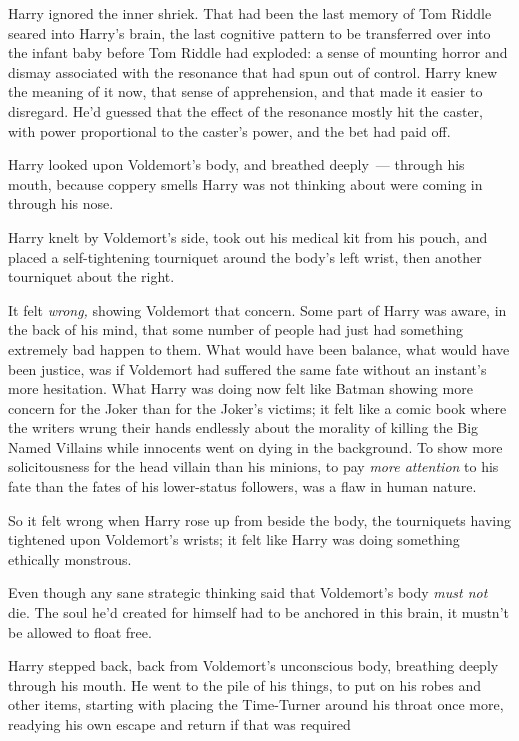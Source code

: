 Harry ignored the inner shriek. That had been the last memory of Tom Riddle
seared into Harry's brain, the last cognitive pattern to be transferred over
into the infant baby before Tom Riddle had exploded: a sense of mounting horror
and dismay associated with the resonance that had spun out of control. Harry
knew the meaning of it now, that sense of apprehension, and that made it easier
to disregard. He'd guessed that the effect of the resonance mostly hit the
caster, with power proportional to the caster's power, and the bet had paid off.

Harry looked upon Voldemort's body, and breathed deeply~--- through his mouth,
because coppery smells Harry was not thinking about were coming in through his
nose.

Harry knelt by Voldemort's side, took out his medical kit from his pouch, and
placed a self-tightening tourniquet around the body's left wrist, then another
tourniquet about the right.

It felt \emph{wrong,} showing Voldemort that concern. Some part of Harry was
aware, in the back of his mind, that some number of people had just had
something extremely bad happen to them. What would have been balance, what
would have been justice, was if Voldemort had suffered the same fate without an
instant's more hesitation. What Harry was doing now felt like Batman showing
more concern for the Joker than for the Joker's victims; it felt like a comic
book where the writers wrung their hands endlessly about the morality of
killing the Big Named Villains while innocents went on dying in the background.
To show more solicitousness for the head villain than his minions, to pay
\emph{more attention} to his fate than the fates of his lower-status followers,
was a flaw in human nature.

So it felt wrong when Harry rose up from beside the body, the tourniquets
having tightened upon Voldemort's wrists; it felt like Harry was doing
something ethically monstrous.

Even though any sane strategic thinking said that Voldemort's body \emph{must
not} die. The soul he'd created for himself had to be anchored in this brain,
it mustn't be allowed to float free.

Harry stepped back, back from Voldemort's unconscious body, breathing deeply
through his mouth. He went to the pile of his things, to put on his robes and
other items, starting with placing the Time-Turner around his throat once more,
readying his own escape and return if that was required{\el}

